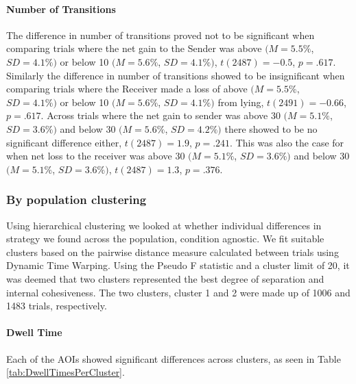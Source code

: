 \documentclass[man, floatsintext]{apa7}
\begin{document}
\paragraph{Number of Transitions}
The difference in number of transitions proved not to be significant when comparing trials where the net gain to the Sender was above $(M = 5.5\%$, $SD = 4.1\%)$ or below 10 $(M = 5.6\%$, $SD = 4.1\%)$, $t(2487)=-0.5$, $p=.617$.
Similarly the difference in number of transitions showed to be insignificant when comparing trials where the Receiver made a loss of above $(M = 5.5\%$, $SD = 4.1\%)$  or below 10 $(M = 5.6\%$, $SD = 4.1\%)$ from lying, $t(2491)=-0.66$, $p=.617$. Across trials where the net gain to sender was above 30 $(M = 5.1\%$, $SD = 3.6\%)$ and below 30 $(M = 5.6\%$, $SD = 4.2\%)$ there showed to be no significant difference either, $t(2487)=1.9$, $p=.241$. This was also the case for when net loss to the receiver was above 30 $(M = 5.1\%$, $SD = 3.6\%)$ and below 30 $(M = 5.1\%$, $SD = 3.6\%)$, $t(2487)=1.3$, $p=.376$.

\subsubsection{By population clustering}
Using hierarchical clustering we looked at whether individual differences in strategy we found across the population, condition agnostic. We fit suitable clusters based on the pairwise distance measure calculated between trials using Dynamic Time Warping. Using the Pseudo F statistic and a cluster limit of 20, it was deemed that two clusters represented the best degree of separation and internal cohesiveness. The two clusters, cluster 1 and 2 were made up of 1006 and 1483 trials, respectively.


\paragraph{Dwell Time}
Each of the AOIs showed significant differences across clusters, as seen in Table \ref{tab:DwellTimesPerCluster}.
\end{document}
